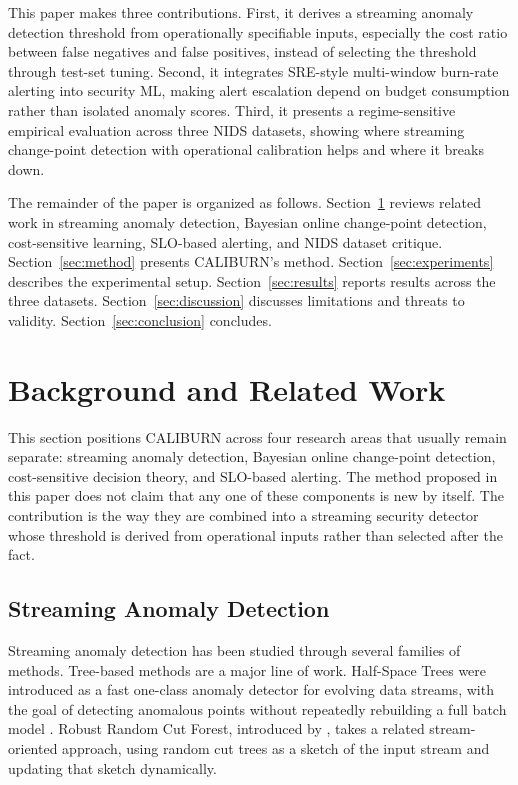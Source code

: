\documentclass[preprint,12pt,authoryear]{elsarticle}
\newcommand{\caliburn}{CALIBURN}
\begin{document}
This paper makes three contributions. First, it derives a streaming anomaly detection threshold from operationally specifiable inputs, especially the cost ratio between false negatives and false positives, instead of selecting the threshold through test-set tuning. Second, it integrates SRE-style multi-window burn-rate alerting into security ML, making alert escalation depend on budget consumption rather than isolated anomaly scores. Third, it presents a regime-sensitive empirical evaluation across three NIDS datasets, showing where streaming change-point detection with operational calibration helps and where it breaks down.

The remainder of the paper is organized as follows. Section~\ref{sec:background} reviews related work in streaming anomaly detection, Bayesian online change-point detection, cost-sensitive learning, SLO-based alerting, and NIDS dataset critique. Section~\ref{sec:method} presents \caliburn{}'s method. Section~\ref{sec:experiments} describes the experimental setup. Section~\ref{sec:results} reports results across the three datasets. Section~\ref{sec:discussion} discusses limitations and threats to validity. Section~\ref{sec:conclusion} concludes.

\section{Background and Related Work}
\label{sec:background}

This section positions \caliburn{} across four research areas that usually remain separate: streaming anomaly detection, Bayesian online change-point detection, cost-sensitive decision theory, and SLO-based alerting. The method proposed in this paper does not claim that any one of these components is new by itself. The contribution is the way they are combined into a streaming security detector whose threshold is derived from operational inputs rather than selected after the fact.

\subsection{Streaming Anomaly Detection}
\label{sec:bg-streaming}

Streaming anomaly detection has been studied through several families of methods. Tree-based methods are a major line of work. Half-Space Trees were introduced as a fast one-class anomaly detector for evolving data streams, with the goal of detecting anomalous points without repeatedly rebuilding a full batch model \citep{tan2011fast}. Robust Random Cut Forest, introduced by \citet{guha2016robust}, takes a related stream-oriented approach, using random cut trees as a sketch of the input stream and updating that sketch dynamically.
\end{document}
